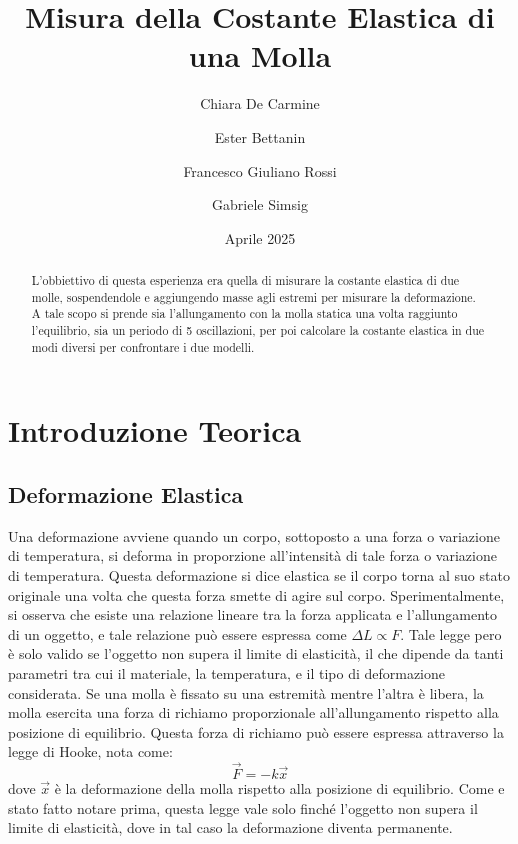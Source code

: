\documentclass[a4paper]{article}
\title{Misura della Costante Elastica di una Molla}
\author{Chiara De Carmine \and Ester Bettanin \and Francesco Giuliano Rossi \and Gabriele Simsig}
\date{Aprile 2025}
\begin{document}
\maketitle
\tableofcontents
\begin{abstract}
    L'obbiettivo di questa esperienza era quella di misurare la costante elastica di due molle, sospendendole e aggiungendo masse agli estremi per misurare la deformazione. A tale scopo si prende sia l'allungamento con la molla statica una volta raggiunto l'equilibrio, sia un periodo di 5 oscillazioni, per poi calcolare la costante elastica in due modi diversi per confrontare i due modelli. 
\end{abstract}

\section{Introduzione Teorica}
\subsection{Deformazione Elastica}
Una deformazione avviene quando un corpo,  sottoposto a una forza o variazione di temperatura, si deforma in proporzione all'intensità di tale forza o variazione di temperatura. Questa deformazione si dice elastica se il corpo torna al suo stato originale una volta che questa forza smette di agire sul corpo. Sperimentalmente, si osserva che esiste una relazione lineare tra la forza applicata e l'allungamento di un oggetto, e tale relazione può essere espressa come $\Delta L \propto F$. Tale legge pero è solo valido se l'oggetto non supera il limite di elasticità, il che dipende da tanti parametri tra cui il materiale, la temperatura, e il tipo di deformazione considerata.  
Se una molla è fissato su una estremità mentre l'altra è libera, la molla esercita una forza di richiamo proporzionale all'allungamento rispetto alla posizione di equilibrio. Questa forza di richiamo può essere espressa attraverso la legge di Hooke, nota come:
\begin{equation}
    \vec{F} = -k\vec{x}
\end{equation}
dove $\vec{x}$ è la deformazione della molla rispetto alla posizione di equilibrio. Come e stato fatto notare prima, questa legge vale solo finché l'oggetto non supera il limite di elasticità, dove in tal caso la deformazione diventa permanente. 
\end{document}
